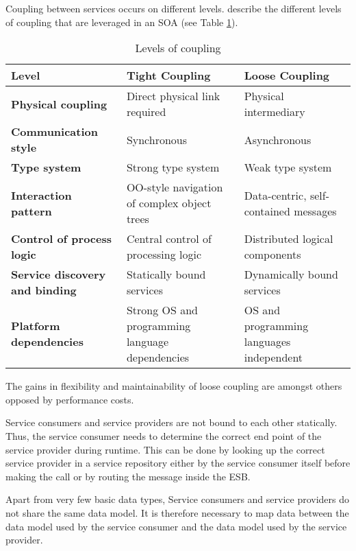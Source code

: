 Coupling between services occurs on different levels. \citet{Krafzig:2005zc} describe the different levels of coupling that are leveraged in an \ac{SOA} (see Table \ref{table:ch02_coupling}).

\begin{table}[htpb]
	\centering
	\begin{tabularx}{\textwidth}{@{} X X X @{}}
		\caption{Levels of coupling}\label{table:ch02_coupling}\\
		\toprule
		\bfseries Level & \bfseries Tight Coupling & \bfseries Loose Coupling\\
		\midrule
		\bfseries Physical coupling & Direct physical link required & Physical intermediary\\
		\midrule
		\bfseries Communication style & Synchronous & Asynchronous\\
		\midrule
		\bfseries Type system & Strong type system & Weak type system\\
		\midrule
		\bfseries Interaction pattern & OO-style navigation of complex object trees & Data-centric, self-contained messages\\
		\midrule
		\bfseries Control of process logic & Central control of processing logic & Distributed logical components\\
		\midrule
		\bfseries Service discovery and binding & Statically bound services & Dynamically bound services\\
		\midrule
		\bfseries Platform dependencies & Strong OS and programming language dependencies & OS and programming languages independent\\
		\bottomrule
	\end{tabularx}
\end{table}

The gains in flexibility and maintainability of loose coupling are amongst others opposed by performance costs.

Service consumers and service providers are not bound to each other statically. Thus, the service consumer needs to determine the correct end point of the service provider during runtime. This can be done by looking up the correct service provider in a service repository either by the service consumer itself before making the call or by routing the message inside the ESB.  

Apart from very few basic data types, Service consumers and service providers do not share the same data model. It is therefore necessary to map data between the data model used by the service consumer and the data model used by the service provider.
